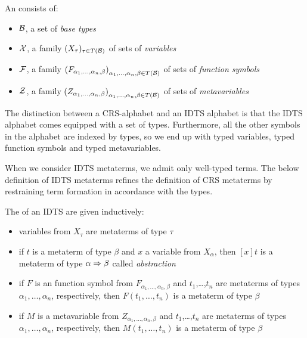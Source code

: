 \begin{definition}
  An  consists of:
  \begin{itemize}
  \item $\mathcal{B}$, a set of \emph{base types}
  \item $\mathcal{X}$, a family $(X_\tau)_{\tau \in T(\mathcal{B})}$ of sets of \emph{variables}
  \item $\mathcal{F}$, a family ${(F_{\alpha_1,\ldots,\alpha_n,\beta})}_{\alpha_1,\ldots,\alpha_n,\beta \in T(\mathcal{B})}$ of sets of \emph{function symbols}
  \item $\mathcal{Z}$, a family ${(Z_{\alpha_1,\ldots,\alpha_n,\beta})}_{\alpha_1,\ldots,\alpha_n,\beta \in T(\mathcal{B})}$ of sets of
    \emph{metavariables}
  \end{itemize}
\end{definition}

The distinction between a CRS-alphabet and an IDTS alphabet is that the
IDTS alphabet comes equipped with a set of types. Furthermore, all the
other symbols in the alphabet are indexed by types, so we end up with typed
variables, typed function symbols and typed metavariables.

When we consider IDTS metaterms, we admit only well-typed terms. The below
definition of IDTS metaterms refines the definition of CRS metaterms by
restraining term formation in accordance with the types.

\begin{definition}
  The  of an IDTS are given inductively:
  \begin{itemize}
  \item variables from $X_\tau$ are metaterms of type $\tau$
  \item if $t$ is a metaterm of type $\beta$ and $x$ a variable from
    $X_\alpha$, then $[x]t$ is a metaterm of type $\alpha \Rightarrow \beta$ called
    \emph{abstraction}
  \item if $F$ is an function symbol from
    $F_{\alpha_1,\ldots,\alpha_n,\beta}$ and $t_1$,\ldots,$t_n$ are
    metaterms of types $\alpha_1,\ldots,\alpha_n$, respectively, then
    $F(t_1,\ldots,t_n)$ is a metaterm of type $\beta$
  \item if $M$ is a metavariable from $Z_{\alpha_1,\ldots,\alpha_n,\beta}$
    and $t_1$,\ldots,$t_n$ are metaterms of types
    $\alpha_1,\ldots,\alpha_n$, respectively, then $M(t_1,\ldots,t_n)$ is a
    metaterm of type $\beta$
  \end{itemize}
\end{definition}

